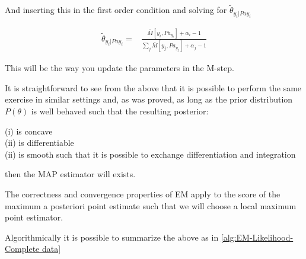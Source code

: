 \documentclass[11pt]{article}
\begin{document}
And inserting this in the first order condition and solving for
\(\tilde{\theta}_{y_i | Pa{y_i}}\)

\begin{align} \label{eq:solution}
\tilde{\theta}_{y_i | Pa{y_i}} =& \frac{\bar{M}[y_i, Pa_{y_i}] + \alpha_i - 1}{\sum_j \bar{M}[y_j, Pa_{y_j}] + \alpha_j - 1}
\end{align}

This will be the way you update the parameters in the M-step.

It is straightforward to see from the above that it is possible to
perform the same exercise in similar settings and, as was proved,
as long as the prior distribution \(P(\theta)\) is well behaved such
that the resulting posterior:

(i) is concave \\
(ii) is differentiable \\
(ii) is smooth such that it is possible to exchange differentiation and integration

then the MAP estimator will exists.

The correctness and convergence properties of EM apply to the score
of the maximum a posteriori point estimate such that we will choose
a local maximum point estimator.

Algorithmically it is possible to summarize the above as in \ref{alg:EM-Likelihood-Complete data}

\algrenewcommand\algorithmicindent{1.5em}%
\end{document}
